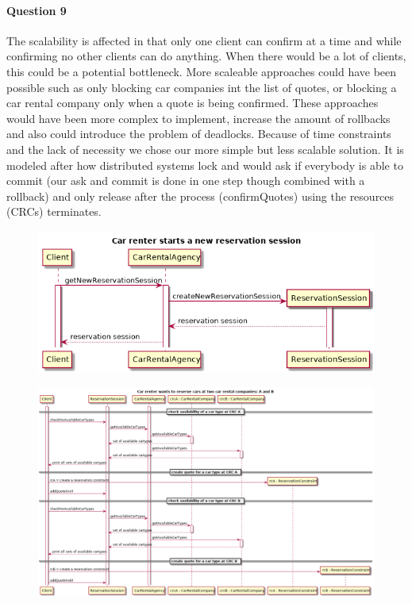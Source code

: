\documentclass{ds-report}
\begin{document}
	\paragraph{Question 9} 
	The scalability is affected in that only one client can confirm at a time and while confirming no other clients can do anything. When there would be a lot of clients, this could be a potential bottleneck. 
	More scaleable approaches could have been possible such as only blocking car companies int the list of quotes, or blocking a car rental company only when a quote is being confirmed.
	These approaches would have been more complex to implement, increase the amount of rollbacks and also could introduce the problem of deadlocks.
	Because of time constraints and the lack of necessity we chose our more simple but less scalable solution.
	It is modeled after how distributed systems lock and would ask if everybody is able to commit (our ask and commit is done in one step though combined with a rollback) and only release after the process (confirmQuotes) using the resources (CRCs) terminates.
	
	\clearpage
	
	
	\begin{landscape}
		\begin{figure}
			\label{startSession}
			\centering
			\includegraphics[width=\paperwidth]{../diagrams/sequenceDiagrams/startSession.png}
		\end{figure}
	\end{landscape}
	
\clearpage
	\begin{landscape}
		\begin{figure}
			\label{reserveCars}
			\centering
			\includegraphics[width=\paperwidth]{../diagrams/sequenceDiagrams/reserveCars.png}
		\end{figure}
	\end{landscape}
	
\end{document}
